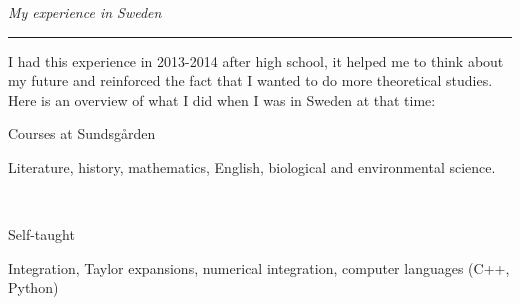 \documentclass[a4paper,10pt]{article}
\begin{document}
	\noindent
	\textit{\Large \color{MyGray} \hspace{5mm} My experience in Sweden}
	\vspace{2mm}
	{\color{DefaultGray}\hrule height .1pt}
	\vspace{5mm}
	
	I had this experience in 2013-2014 after high school, it helped me to think about my future and reinforced the fact that I wanted to do more theoretical studies. Here is an overview of what I did when I was in Sweden at that time:
	\vspace{3mm}
	
	\noindent
	\begin{minipage}{0.25\textwidth}
		\color{MyGray} Courses at Sundsgården
	\end{minipage}
	\hfill
	\begin{minipage}{0.70\textwidth}
		Literature, history, mathematics, English, biological and environmental science.
	\end{minipage}\\
	\vspace{2mm}
	
	\noindent
	\begin{minipage}{0.25\textwidth}
		\color{MyGray} Self-taught
	\end{minipage}
	\hfill
	\begin{minipage}{0.70\textwidth}
		Integration, Taylor expansions, numerical integration, computer languages (C++, Python)
	\end{minipage}\\
	\vspace{2mm}
	
\end{document}
